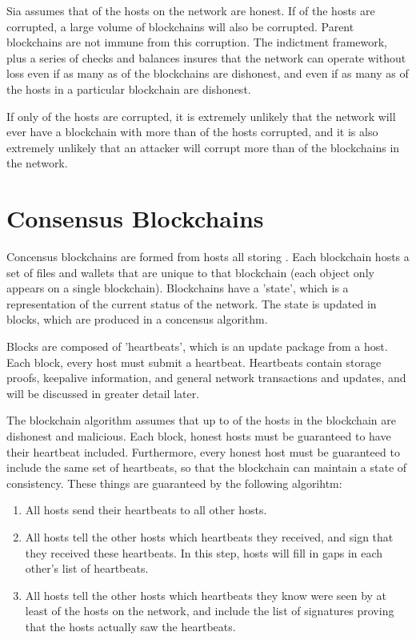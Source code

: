 \documentclass[twocolumn]{article}
\begin{document}
Sia assumes that \fiftyone \space of the hosts on the network are honest.
If \fortynine \space of the hosts are corrupted, a large volume of blockchains will also be corrupted.
Parent blockchains are not immune from this corruption.
The indictment framework, plus a series of checks and balances insures that the network can operate without loss even if as many as \maxcorruption \space of the blockchains are dishonest, and even if as many as \maxcorruption \space of the hosts in a particular blockchain are dishonest.

If only \fortynine \space of the hosts are corrupted, it is extremely unlikely that the network will ever have a blockchain with more than \maxcorruption \space of the hosts corrupted, and it is also extremely unlikely that an attacker will corrupt more than \maxcorruption \space of the blockchains in the network.

\section{Consensus Blockchains}

Concensus blockchains are formed from \numhosts \space hosts all storing \storageperhost.
Each blockchain hosts a set of files and wallets that are unique to that blockchain (each object only appears on a single blockchain).
Blockchains have a 'state', which is a representation of the current status of the network.
The state is updated in blocks, which are produced in a concensus algorithm.

Blocks are composed of 'heartbeats', which is an update package from a host.
Each block, every host must submit a heartbeat.
Heartbeats contain storage proofs, keepalive information, and general network transactions and updates, and will be discussed in greater detail later.

The blockchain algorithm assumes that up to \fortynine \space of the hosts in the blockchain are dishonest and malicious.
Each block, honest hosts must be guaranteed to have their heartbeat included.
Furthermore, every honest host must be guaranteed to include the same set of heartbeats, so that the blockchain can maintain a state of consistency.
These things are guaranteed by the following algorihtm:

\begin{enumerate}
	\item All hosts send their heartbeats to all other hosts.
	\item All hosts tell the other hosts which heartbeats they received, and sign that they received these heartbeats.
	In this step, hosts will fill in gaps in each other's list of heartbeats.
	\item All hosts tell the other hosts which heartbeats they know were seen by at least \fiftyone \space of the hosts on the network, and include the list of signatures proving that the hosts actually saw the heartbeats.
\end{enumerate}
\end{document}
